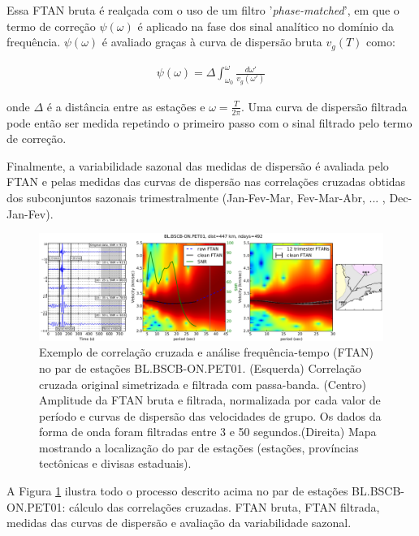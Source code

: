 Essa FTAN bruta é realçada com o uso de um filtro '\textit{phase-matched}', em que o termo de correção $\psi(\omega)$ é aplicado na fase dos sinal analítico no domínio da frequência. $\psi(\omega)$ é avaliado graças à curva de dispersão bruta $v_{g}(T)$ como:

\begin{eqnarray}
\psi(\omega) = \Delta \int_{\omega_{0}}^{\omega} \frac{{d\omega}'}{v_{g}({\omega}')}
\end{eqnarray}

onde $\Delta$ é a distância entre as estações e $\omega = \frac{T}{2\pi}$. Uma curva de dispersão filtrada pode então ser medida repetindo o primeiro passo com o sinal filtrado pelo termo de correção.

Finalmente, a variabilidade sazonal das medidas de dispersão é avaliada pelo FTAN e pelas medidas das curvas de dispersão nas correlações cruzadas obtidas dos subconjuntos sazonais trimestralmente (Jan-Fev-Mar, Fev-Mar-Abr, ... , Dec-Jan-Fev). 

\begin{figure}[!ht]
\centering
\includegraphics[scale=0.3]{Figs/correlacao_FTAN.png}
\caption[Exemplo de correlação cruzada e análise frequência-tempo (FTAN) no par de estações BL.BSCB-ON.PET01.]{Exemplo de correlação cruzada e análise frequência-tempo (FTAN) no par de estações BL.BSCB-ON.PET01. (Esquerda) Correlação cruzada original simetrizada e filtrada com passa-banda. (Centro) Amplitude da FTAN bruta e filtrada, normalizada por cada valor de período e curvas de dispersão das velocidades de grupo. Os dados da forma de onda foram filtradas entre 3 e 50 segundos.(Direita) Mapa mostrando a localização do par de estações (estações, províncias tectônicas e divisas estaduais).}
\label{correlacao_FTAN}
\end{figure} 

A Figura \ref{correlacao_FTAN} ilustra todo o processo descrito acima no par de estações BL.BSCB-ON.PET01: cálculo das correlações cruzadas. FTAN bruta, FTAN filtrada, medidas das curvas de dispersão e avaliação da variabilidade sazonal. 

